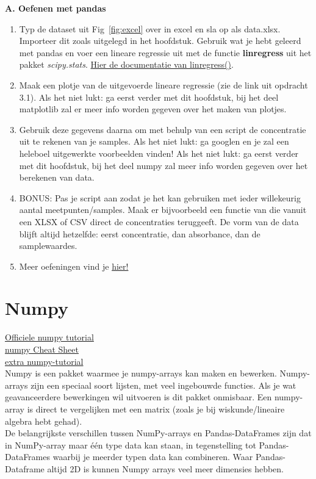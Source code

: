 \textbf{A. Oefenen met pandas}
\begin{enumerate}[label=\textbf{A.\arabic*}]
\item Typ de dataset uit Fig~\ref{fig:excel} over in excel en sla op als data.xlsx. Importeer dit zoals uitgelegd in het hoofdstuk. Gebruik wat je hebt geleerd met pandas en voer een lineare regressie uit met de functie \textbf{linregress} uit het pakket \textit{scipy.stats}. \href{https://docs.scipy.org/doc/scipy/reference/generated/scipy.stats.linregress.html}{Hier de documentatie van linregress()}. 
\item Maak een plotje van de uitgevoerde lineare regressie (zie de link uit opdracht 3.1). Als het niet lukt: ga eerst verder met dit hoofdstuk, bij het deel matplotlib zal er meer info worden gegeven over het maken van plotjes.
\item Gebruik deze gegevens daarna om met behulp van een script de concentratie uit te rekenen van je samples. Als het niet lukt: ga googlen en je zal een heleboel uitgewerkte voorbeelden vinden! Als het niet lukt: ga eerst verder met dit hoofdstuk, bij het deel numpy zal meer info worden gegeven over het berekenen van data. 
\item BONUS: Pas je script aan zodat je het kan gebruiken met ieder willekeurig aantal meetpunten/samples. Maak er bijvoorbeeld een functie van die vanuit een XLSX of CSV direct de concentraties teruggeeft. De vorm van de data blijft altijd hetzelfde: eerst concentratie, dan absorbance, dan de samplewaardes.
\item Meer oefeningen vind je \href{https://github.com/ajcr/100-pandas-puzzles}{hier!}
\end{enumerate}

\section{Numpy}
\href{https://docs.scipy.org/doc/numpy/user/quickstart.html}{Officiele numpy tutorial}\\
\href{https://s3.amazonaws.com/assets.datacamp.com/blog_assets/Numpy_Python_Cheat_Sheet.pdf}{numpy Cheat Sheet}\\
\href{http://cs231n.github.io/python-numpy-tutorial/#numpy}{extra numpy-tutorial}\\
Numpy is een pakket waarmee je numpy-arrays kan maken en bewerken. Numpy-arrays zijn een speciaal soort lijsten, met veel ingebouwde functies. Als je wat geavanceerdere bewerkingen wil uitvoeren is dit pakket onmisbaar. Een numpy-array is direct te vergelijken met een matrix (zoals je bij wiskunde/lineaire algebra hebt gehad).
\\De belangrijkste verschillen tussen NumPy-arrays en Pandas-DataFrames zijn dat in NumPy-array maar \'e\'en type data kan staan, in tegenstelling tot Pandas-DataFrames waarbij je meerder typen data kan combineren. Waar Pandas-Dataframe altijd 2D is kunnen Numpy arrays veel meer dimensies hebben.

